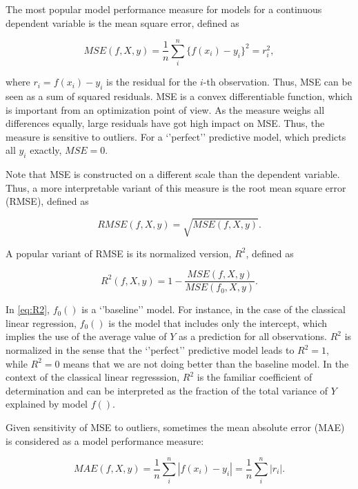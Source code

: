 \documentclass[12pt,]{krantz}
\begin{document}
The most popular model performance measure for models for a continuous dependent variable is the mean square error, defined as

\begin{equation}
MSE(f,X,y) = \frac{1}{n} \sum_{i}^{n} \{f(x_i) - y_i\}^2 = r_i^2,
\label{eq:MSE}
\end{equation}

where \(r_i=f(x_i) - y_i\) is the residual for the \(i\)-th observation. Thus, MSE can be seen as a sum of squared residuals. MSE is a convex differentiable function, which is important from an optimization point of view. As the measure weighs all differences equally, large residuals have got high impact on MSE. Thus, the measure is sensitive to outliers. For a `'perfect'' predictive model, which predicts all \(y_i\) exactly, \(MSE = 0\).

Note that MSE is constructed on a different scale than the dependent variable. Thus, a more interpretable variant of this measure is the root mean square error (RMSE), defined as

\begin{equation}
RMSE(f, X, y) = \sqrt{MSE(f, X, y)}.
\label{eq:RMSE}
\end{equation}

A popular variant of RMSE is its normalized version, \(R^2\), defined as

\begin{equation}
R^2(f, X, y) = 1 - \frac{MSE(f, X, y)}{MSE(f_0, X,y)}.
\label{eq:R2}
\end{equation}

In \eqref{eq:R2}, \(f_0()\) is a `'baseline'' model. For instance, in the case of the classical linear regression, \(f_0()\) is the model that includes only the intercept, which implies the use of the average value of \(Y\) as a prediction for all observations. \(R^2\) is normalized in the sense that the `'perfect'' predictive model leads to \(R^2 = 1\), while \(R^2 = 0\) means that we are not doing better than the baseline model. In the context of the classical linear regresssion, \(R^2\) is the familiar coefficient of determination and can be interpreted as the fraction of the total variance of \(Y\) explained by model \(f()\).

Given sensitivity of MSE to outliers, sometimes the mean absolute error (MAE) is considered as a model performance measure:

\begin{equation}
MAE(f, X ,y) = \frac{1}{n} \sum_{i}^{n} |f(x_i) - y_i| = \frac{1}{n} \sum_{i}^{n} |r_i|.
\label{eq:MAE}
\end{equation}
\end{document}
